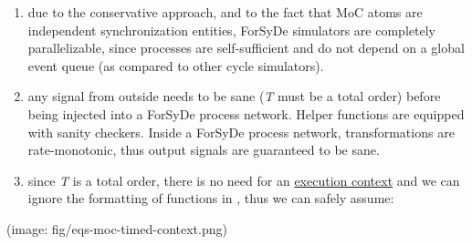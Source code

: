 \begin{enumerate}
                 \item 
                 due to the conservative approach, and to the fact that MoC
 atoms are independent synchronization entities, ForSyDe
 simulators are completely parallelizable, since processes are
 self-sufficient and do not depend on a global event queue (as
 compared to other cycle simulators).\par
                 
                 \item 
                 any signal from outside needs to be sane (\emph{T} must be a total
 order) before being injected into a ForSyDe process
 network. Helper functions are equipped with sanity
 checkers. Inside a ForSyDe process network, transformations are
 rate-monotonic, thus output signals are guaranteed to be sane.\par
                 
                 \item 
                 since \emph{T} is a total order, there is no need for an
 \href{ForSyDe-Atom-MoC.html#context}{execution context} and we can
 ignore the formatting of functions in , thus we
 can safely assume:\par
                 
                 \end{enumerate}
                 (image: fig/eqs-moc-timed-context.png)\par
                 
